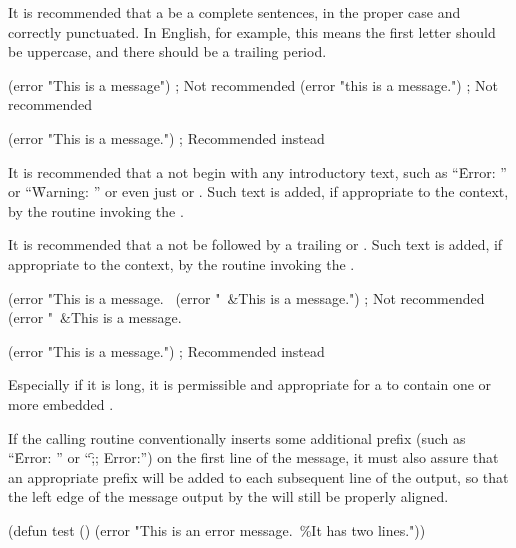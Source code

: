 
It is recommended that a  be a complete sentences, in the
proper case and correctly punctuated.  In English, for example, this
means the first letter should be uppercase, and there should be a
trailing period.

\code
 (error "This is a message")  ; Not recommended
 (error "this is a message.") ; Not recommended

 (error "This is a message.") ; Recommended instead
\endcode

\endsubsubsubsection%


It is recommended that a  not begin with any 
introductory text, such as ``\f{Error: }'' or ``\f{Warning: }''
or even just  or . 
Such text is added, if appropriate to the context,
by the routine invoking the .

It is recommended that a  not be followed 
by a trailing  or .
Such text is added, if appropriate to the context, 
by the routine invoking the .

\code
 (error "This is a message.~%
 (error "~&This is a message.")   ; Not recommended
 (error "~&This is a message.~%

 (error "This is a message.")     ; Recommended instead
\endcode

\endsubsubsubsection%


Especially if it is long, it is permissible and appropriate for 
a  to contain one or more embedded .

If the calling routine conventionally inserts some additional prefix
(such as ``\f{Error: }'' or ``\f{;; Error:''}) on the first line of
the message, it must also assure that an appropriate prefix will be
added to each subsequent line of the output, so that the left edge of
the message output by the  will still be properly
aligned.

\code
 (defun test ()
   (error "This is an error message.~\%It has two lines."))

